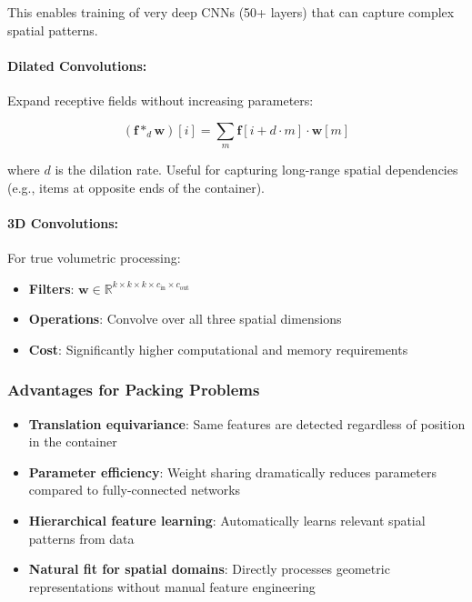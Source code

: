 This enables training of very deep CNNs (50+ layers) that can capture complex spatial patterns.

\paragraph{Dilated Convolutions:}

Expand receptive fields without increasing parameters:

\begin{equation}
(\mathbf{f} *_d \mathbf{w})[i] = \sum_{m} \mathbf{f}[i + d \cdot m] \cdot \mathbf{w}[m]
\end{equation}

where $d$ is the dilation rate. Useful for capturing long-range spatial dependencies (e.g., items at opposite ends of the container).

\paragraph{3D Convolutions:}

For true volumetric processing:

\begin{itemize}
\item \textbf{Filters}: $\mathbf{w} \in \mathbb{R}^{k \times k \times k \times c_{\text{in}} \times c_{\text{out}}}$
\item \textbf{Operations}: Convolve over all three spatial dimensions
\item \textbf{Cost}: Significantly higher computational and memory requirements
\end{itemize}

\subsubsection{Advantages for Packing Problems}

\begin{itemize}
\item \textbf{Translation equivariance}: Same features are detected regardless of position in the container
\item \textbf{Parameter efficiency}: Weight sharing dramatically reduces parameters compared to fully-connected networks
\item \textbf{Hierarchical feature learning}: Automatically learns relevant spatial patterns from data
\item \textbf{Natural fit for spatial domains}: Directly processes geometric representations without manual feature engineering
\end{itemize}


